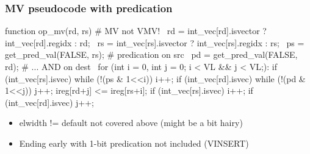 \documentclass[slidestop]{beamer}
\begin{document}


\begin{frame}[fragile]
\frametitle{MV pseudocode with predication}

\begin{semiverbatim}
function op\_mv(rd, rs) # MV not VMV!
  rd = int\_vec[rd].isvector ? int\_vec[rd].regidx : rd;
  rs = int\_vec[rs].isvector ? int\_vec[rs].regidx : rs;
  ps = get\_pred\_val(FALSE, rs); # predication on src
  pd = get\_pred\_val(FALSE, rd); # ... AND on dest
  for (int i = 0, int j = 0; i < VL && j < VL;):
    if (int\_vec[rs].isvec) while (!(ps \& 1<<i)) i++;
    if (int\_vec[rd].isvec) while (!(pd \& 1<<j)) j++;
    ireg[rd+j] <= ireg[rs+i];
    if (int\_vec[rs].isvec) i++;
    if (int\_vec[rd].isvec) j++;
\end{semiverbatim}

  \begin{itemize}
   \item elwidth != default not covered above (might be a bit hairy)
   \item Ending early with 1-bit predication not included (VINSERT)
  \end{itemize}
\end{frame}
\end{document}
